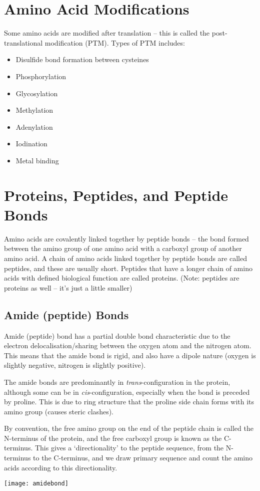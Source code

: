 \section{Amino Acid Modifications}

Some amino acids are modified after translation -- this is called the post-translational modification (PTM).
Types of PTM includes:
\begin{itemize}
    \item Disulfide bond formation between cysteines
    \item Phosphorylation
    \item Glycosylation
    \item Methylation
    \item Adenylation
    \item Iodination
    \item Metal binding
\end{itemize}

\section{Proteins, Peptides, and Peptide Bonds}

Amino acids are covalently linked together by peptide bonds -- the bond formed between the amino group of one amino acid with a carboxyl group of another amino acid.
A chain of amino acids linked together by peptide bonds are called peptides, and these are usually short.
Peptides that have a longer chain of amino acids with defined biological function are called proteins.
(Note: peptides are proteins as well -- it's just a little smaller)

\subsection{Amide (peptide) Bonds}

Amide (peptide) bond has a partial double bond characteristic due to the electron delocalisation/sharing between the oxygen atom and the nitrogen atom.
This means that the amide bond is rigid, and also have a dipole nature (oxygen is slightly negative, nitrogen is slightly positive).

The amide bonds are predominantly in \textit{trans}-configuration in the protein, although some can be in \textit{cis}-configuration, especially when the bond is preceded by proline.
This is due to ring structure that the proline side chain forms with its amino group (causes steric clashes).

By convention, the free amino group on the end of the peptide chain is called the N-terminus of the protein, and the free carboxyl group is known as the C-terminus.
This gives a `directionality' to the peptide sequence, from the N-terminus to the C-terminus, and we draw primary sequence and count the amino acids according to this directionality.

\begin{center}
\texttt{[image: amidebond]}
\end{center}
